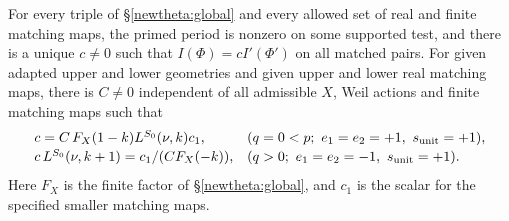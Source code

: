 \begin{theorem}\label{tcr:global}
For every triple of \S\ref{newtheta:global} and every allowed set
of real and finite matching maps, the primed period is nonzero
on some supported test, and there is a unique \(c\ne0\) such that
\(I(\Phi)=cI'(\Phi')\) on all matched pairs. For given adapted upper
and lower geometries and given upper and lower real matching maps,
there is \(C\ne0\) independent of all admissible \(X\), Weil actions
and finite matching maps such that
\[
 \begin{array}{ll}
 c=C\,F_X(1-k)L^{S_0}(\nu,k)c_1,
       &(q=0<p;\ e_1=e_2=+1,\ s_{\rm unit}=+1),\\[2pt]
 c\,L^{S_0}(\nu,k+1)=c_1/(C F_X(-k)),
       &(q>0;\ e_1=e_2=-1,\ s_{\rm unit}=+1).
 \end{array}
\]
Here \(F_X\) is the finite factor of \S\ref{newtheta:global},
and \(c_1\) is the scalar for the specified smaller matching maps.
\end{theorem}

